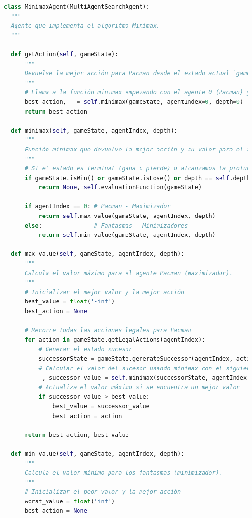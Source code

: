\documentclass{report}
\begin{document}
          \begin{lstlisting}[language=Python, caption=Implementación final del BFS]
class MinimaxAgent(MultiAgentSearchAgent):
  """
  Agente que implementa el algoritmo Minimax.
  """

  def getAction(self, gameState):
      """
      Devuelve la mejor acción para Pacman desde el estado actual `gameState` usando Minimax.
      """
      # Llama a la función minimax empezando con el agente 0 (Pacman) y profundidad 0
      best_action, _ = self.minimax(gameState, agentIndex=0, depth=0)
      return best_action

  def minimax(self, gameState, agentIndex, depth):
      """
      Función minimax que devuelve la mejor acción y su valor para el agente actual.
      """
      # Si el estado es terminal (gana o pierde) o alcanzamos la profundidad máxima, evaluamos el estado
      if gameState.isWin() or gameState.isLose() or depth == self.depth:
          return None, self.evaluationFunction(gameState)

      if agentIndex == 0: # Pacman - Maximizador
          return self.max_value(gameState, agentIndex, depth)
      else:               # Fantasmas - Minimizadores
          return self.min_value(gameState, agentIndex, depth)

  def max_value(self, gameState, agentIndex, depth):
      """
      Calcula el valor máximo para el agente Pacman (maximizador).
      """
      # Inicializar el mejor valor y la mejor acción
      best_value = float('-inf')
      best_action = None

      # Recorre todas las acciones legales para Pacman
      for action in gameState.getLegalActions(agentIndex):
          # Generar el estado sucesor
          successorState = gameState.generateSuccessor(agentIndex, action)
          # Calcular el valor del sucesor usando minimax con el siguiente agente
          _, successor_value = self.minimax(successorState, agentIndex + 1, depth)
          # Actualiza el valor máximo si se encuentra un mejor valor
          if successor_value > best_value:
              best_value = successor_value
              best_action = action

      return best_action, best_value

  def min_value(self, gameState, agentIndex, depth):
      """
      Calcula el valor mínimo para los fantasmas (minimizador).
      """
      # Inicializar el peor valor y la mejor acción
      worst_value = float('inf')
      best_action = None


\end{lstlisting}
\end{document}
